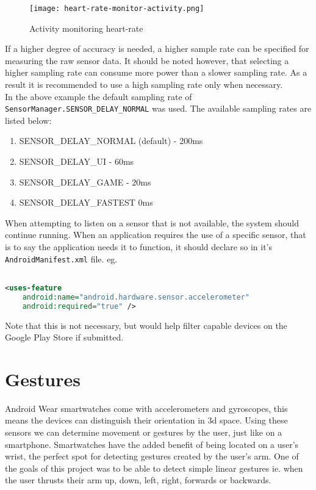\begin{figure}
    \centering
    \texttt{[image: heart-rate-monitor-activity.png]}
    \caption{Activity monitoring heart-rate}
    \label{fig:awesome_image}
\end{figure}

If a higher degree of accuracy is needed, a higher sample rate can be specified
for measuring the raw sensor data. It should be noted however, that selecting a
higher sampling rate can consume more power than a slower sampling rate. As a
result it is recommended to use a high sampling rate only when necessary.\\
In the above example the default sampling rate of
\texttt{SensorManager.SENSOR\_DELAY\_NORMAL} was used. The available sampling
rates are listed below:
\begin{enumerate}
\item SENSOR\_DELAY\_NORMAL (default) - 200ms
\item SENSOR\_DELAY\_UI - 60ms
\item SENSOR\_DELAY\_GAME - 20ms
\item SENSOR\_DELAY\_FASTEST 0ms
\end{enumerate}

When attempting to listen on a sensor that is not available, the system should
continue running. When an application requires the use of a specific sensor,
that is to say the application needs it to function, it should declare so in
it's \texttt{AndroidManifest.xml} file. eg.

\begin{lstlisting}[language=XML]

<uses-feature
    android:name="android.hardware.sensor.accelerometer"
    android:required="true" />

\end{lstlisting}

Note that this is not necessary, but would help filter capable devices on the 
Google Play Store if submitted.



\clearpage
\section{Gestures}

Android Wear smartwatches come with accelerometers and gyroscopes, this means
the devices can distinguish their orientation in 3d space. Using these sensors
we can determine movement or gestures by the user, just like on a smartphone.
Smartwatches have the added benefit of being located on a user's wrist, the
perfect spot for detecting gestures created by the user's arm. One of the goals
of this project was to be able to detect simple linear gestures ie. when
the user thrusts their arm up, down, left, right, forwards or backwards.

